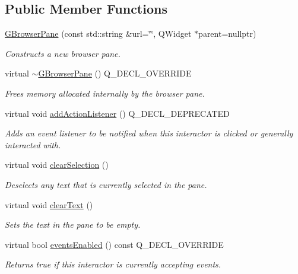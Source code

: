\subsection*{Public Member Functions}
\begin{DoxyCompactItemize}
\item 
\mbox{\hyperlink{classGBrowserPane_a8f540c6f1aab2b4278bea6b1139aa470}{G\+Browser\+Pane}} (const std\+::string \&url=\char`\"{}\char`\"{}, Q\+Widget $\ast$parent=nullptr)
\begin{DoxyCompactList}\small\item\em Constructs a new browser pane. \end{DoxyCompactList}\item 
virtual \mbox{\hyperlink{classGBrowserPane_a6539ae341df015236b39f5a166ec7184}{$\sim$\+G\+Browser\+Pane}} () Q\+\_\+\+D\+E\+C\+L\+\_\+\+O\+V\+E\+R\+R\+I\+DE
\begin{DoxyCompactList}\small\item\em Frees memory allocated internally by the browser pane. \end{DoxyCompactList}\item 
virtual void \mbox{\hyperlink{classGInteractor_a02f20ea6edfa0671f31c4c648a253833}{add\+Action\+Listener}} () Q\+\_\+\+D\+E\+C\+L\+\_\+\+D\+E\+P\+R\+E\+C\+A\+T\+ED
\begin{DoxyCompactList}\small\item\em Adds an event listener to be notified when this interactor is clicked or generally interacted with. \end{DoxyCompactList}\item 
virtual void \mbox{\hyperlink{classGBrowserPane_abd07e172ccec6823a88289c21124a367}{clear\+Selection}} ()
\begin{DoxyCompactList}\small\item\em Deselects any text that is currently selected in the pane. \end{DoxyCompactList}\item 
virtual void \mbox{\hyperlink{classGBrowserPane_a25f53c7d92eb2a5197cd4418c0165367}{clear\+Text}} ()
\begin{DoxyCompactList}\small\item\em Sets the text in the pane to be empty. \end{DoxyCompactList}\item 
virtual bool \mbox{\hyperlink{classGInteractor_ac05ba5b92e2e5146d416fe7f842a0969}{events\+Enabled}} () const Q\+\_\+\+D\+E\+C\+L\+\_\+\+O\+V\+E\+R\+R\+I\+DE
\begin{DoxyCompactList}\small\item\em Returns true if this interactor is currently accepting events. \end{DoxyCompactList}\item 

\end{DoxyCompactItemize}
